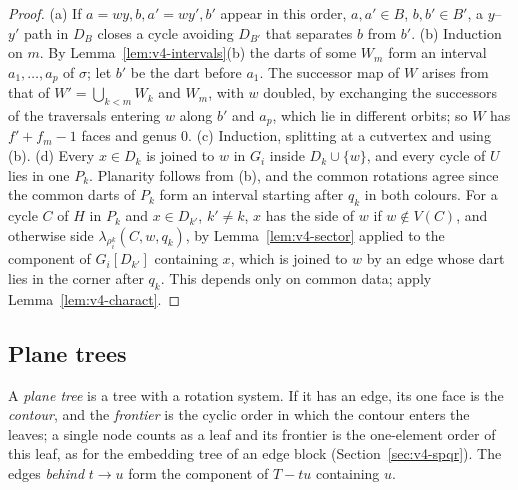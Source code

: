 \begin{proof}
(a) If $a=wy,b,a'=wy',b'$ appear in this order, $a,a'\in B$, $b,b'\in B'$, a
$y$--$y'$ path in $D_B$ closes a cycle avoiding $D_{B'}$ that separates $b$
from $b'$. (b) Induction on $m$. By Lemma~\ref{lem:v4-intervals}(b) the
darts of some $W_m$ form an interval $a_1,\dots,a_p$ of $\sigma$; let $b'$
be the dart before $a_1$. The successor map of $W$ arises from that of
$W'=\bigcup_{k<m}W_k$ and $W_m$, with $w$ doubled, by exchanging the
successors of the traversals entering $w$ along $b'$ and $a_p$, which lie in
different orbits; so $W$ has $f'+f_m-1$ faces and genus $0$. (c) Induction,
splitting at a cutvertex and using (b). (d) Every $x\in D_k$ is joined to $w$ in $G_i$ inside $D_k\cup\{w\}$, and
every cycle of $U$ lies in one $P_k$. Planarity follows from (b), and the
common rotations agree since the common darts of $P_k$ form an interval
starting after $q_k$ in both colours. For a cycle $C$ of $H$ in $P_k$ and
$x\in D_{k'}$, $k'\neq k$, $x$ has the side of $w$ if $w\notin V(C)$, and
otherwise side $\lambda_{\rho^k_i}(C,w,q_k)$, by Lemma~\ref{lem:v4-sector}
applied to the component of $G_i[D_{k'}]$ containing $x$, which is joined to
$w$ by an edge whose dart lies in the corner after $q_k$. This depends only on
common data; apply Lemma~\ref{lem:v4-charact}.
\end{proof}

\subsection{Plane trees}\label{sec:v4-trees}

A \emph{plane tree} is a tree with a rotation system. If it has an edge,
its one face is the \emph{contour}, and the \emph{frontier} is the cyclic
order in which the contour enters the leaves; a single node counts as a leaf
and its frontier is the one-element order of this leaf, as for the embedding
tree of an edge block (Section~\ref{sec:v4-spqr}). The edges \emph{behind} $t\to u$ form the
component of $T-tu$ containing $u$.

